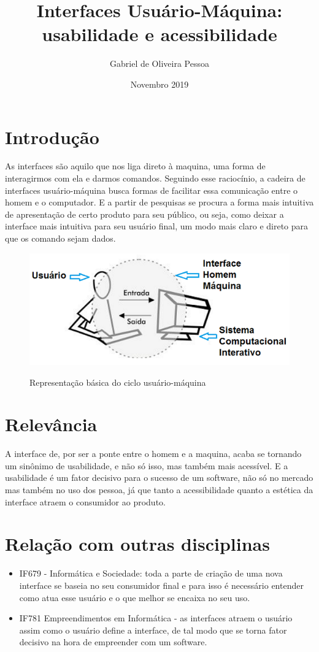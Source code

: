 \documentclass[10pt]{article}
\title{Interfaces Usuário-Máquina: usabilidade e acessibilidade}
\author{Gabriel de Oliveira Pessoa}
\date{Novembro 2019}
\begin{document}
\maketitle

\section{Introdução}
As interfaces são aquilo que nos liga direto à maquina, uma forma de interagirmos com ela e darmos comandos. Seguindo esse raciocínio, a cadeira de interfaces usuário-máquina busca formas de facilitar essa comunicação entre o homem e o computador. E a partir de pesquisas se procura a forma mais intuitiva de apresentação de certo produto para seu público, ou seja, como deixar a interface mais intuitiva para seu usuário final, um modo mais claro e direto para que os comando sejam dados.

\begin{figure}[h!]
\centering
\includegraphics[scale=0.5]{UI.png}
\caption{Representação básica do ciclo usuário-máquina}\cite{hitecnologia}
\label{fig:universe}
\end{figure}

\section{Relevância}
A interface de, por ser a ponte entre o homem e a maquina, acaba se tornando um sinônimo de usabilidade, e não só isso, mas também mais acessível. E a usabilidade é um fator decisivo para o sucesso de um software, não só no mercado mas também no uso dos pessoa, já que tanto a acessibilidade quanto a estética da interface atraem o consumidor ao produto. \cite{repositorioufsc} \cite{olharcientifico}

\section{Relação com outras disciplinas}
\begin{itemize}
\item IF679 - Informática e Sociedade: toda a parte de criação de uma nova interface se baseia no seu consumidor final e para isso é necessário entender como atua esse usuário e o que melhor se encaixa no seu uso. \cite{br-ie}
\item IF781 Empreendimentos em Informática - as interfaces atraem o usuário assim como o usuário define a interface, de tal modo que se torna fator decisivo na hora de empreender com um software. \cite{repositorioufsc}
\end{itemize}


\end{document}
